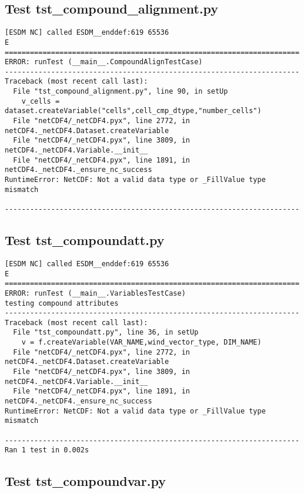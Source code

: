 \subsection{Test tst\_compound\_alignment.py}

\begin{verbatim}
[ESDM NC] called ESDM__enddef:619 65536
E
======================================================================
ERROR: runTest (__main__.CompoundAlignTestCase)
----------------------------------------------------------------------
Traceback (most recent call last):
  File "tst_compound_alignment.py", line 90, in setUp
    v_cells = dataset.createVariable("cells",cell_cmp_dtype,"number_cells")
  File "netCDF4/_netCDF4.pyx", line 2772, in netCDF4._netCDF4.Dataset.createVariable
  File "netCDF4/_netCDF4.pyx", line 3809, in netCDF4._netCDF4.Variable.__init__
  File "netCDF4/_netCDF4.pyx", line 1891, in netCDF4._netCDF4._ensure_nc_success
RuntimeError: NetCDF: Not a valid data type or _FillValue type mismatch

----------------------------------------------------------------------
\end{verbatim}

\subsection{Test tst\_compoundatt.py}

\begin{verbatim}
[ESDM NC] called ESDM__enddef:619 65536
E
======================================================================
ERROR: runTest (__main__.VariablesTestCase)
testing compound attributes
----------------------------------------------------------------------
Traceback (most recent call last):
  File "tst_compoundatt.py", line 36, in setUp
    v = f.createVariable(VAR_NAME,wind_vector_type, DIM_NAME)
  File "netCDF4/_netCDF4.pyx", line 2772, in netCDF4._netCDF4.Dataset.createVariable
  File "netCDF4/_netCDF4.pyx", line 3809, in netCDF4._netCDF4.Variable.__init__
  File "netCDF4/_netCDF4.pyx", line 1891, in netCDF4._netCDF4._ensure_nc_success
RuntimeError: NetCDF: Not a valid data type or _FillValue type mismatch

----------------------------------------------------------------------
Ran 1 test in 0.002s
\end{verbatim}

\subsection{Test tst\_compoundvar.py}

